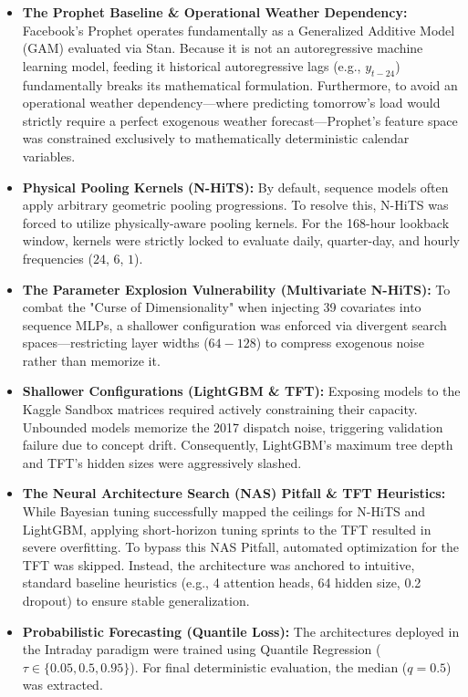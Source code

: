 \documentclass{article}
\begin{document}
\begin{itemize}
    \item \textbf{The Prophet Baseline \& Operational Weather Dependency:} Facebook’s Prophet operates fundamentally as a Generalized Additive Model (GAM) evaluated via Stan. Because it is not an autoregressive machine learning model, feeding it historical autoregressive lags (e.g., $y_{t-24}$) fundamentally breaks its mathematical formulation. Furthermore, to avoid an operational weather dependency—where predicting tomorrow's load would strictly require a perfect exogenous weather forecast—Prophet's feature space was constrained exclusively to mathematically deterministic calendar variables.
    \item \textbf{Physical Pooling Kernels (N-HiTS):} By default, sequence models often apply arbitrary geometric pooling progressions. To resolve this, N-HiTS was forced to utilize physically-aware pooling kernels. For the 168-hour lookback window, kernels were strictly locked to evaluate daily, quarter-day, and hourly frequencies ($24$, $6$, $1$).
    \item \textbf{The Parameter Explosion Vulnerability (Multivariate N-HiTS):} To combat the "Curse of Dimensionality" when injecting 39 covariates into sequence MLPs, a shallower configuration was enforced via divergent search spaces—restricting layer widths ($64-128$) to compress exogenous noise rather than memorize it.
    \item \textbf{Shallower Configurations (LightGBM \& TFT):} Exposing models to the Kaggle Sandbox matrices required actively constraining their capacity. Unbounded models memorize the 2017 dispatch noise, triggering validation failure due to concept drift. Consequently, LightGBM's maximum tree depth and TFT's hidden sizes were aggressively slashed.
    \item \textbf{The Neural Architecture Search (NAS) Pitfall \& TFT Heuristics:} While Bayesian tuning successfully mapped the ceilings for N-HiTS and LightGBM, applying short-horizon tuning sprints to the TFT resulted in severe overfitting. To bypass this NAS Pitfall, automated optimization for the TFT was skipped. Instead, the architecture was anchored to intuitive, standard baseline heuristics (e.g., 4 attention heads, 64 hidden size, 0.2 dropout) to ensure stable generalization.
    \item \textbf{Probabilistic Forecasting (Quantile Loss):} The architectures deployed in the Intraday paradigm were trained using Quantile Regression ($\tau \in \{0.05, 0.5, 0.95\}$). For final deterministic evaluation, the median ($q=0.5$) was extracted.
\end{itemize}
\end{document}
